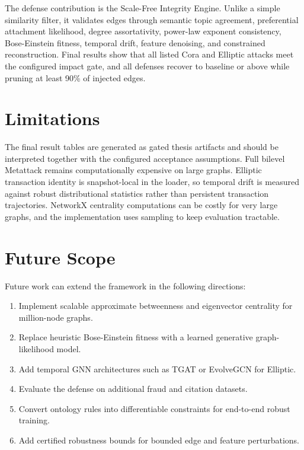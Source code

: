 \documentclass[12pt,oneside]{report}
\begin{document}
The defense contribution is the Scale-Free Integrity Engine. Unlike a simple similarity filter, it validates edges through semantic topic agreement, preferential attachment likelihood, degree assortativity, power-law exponent consistency, Bose-Einstein fitness, temporal drift, feature denoising, and constrained reconstruction. Final results show that all listed Cora and Elliptic attacks meet the configured impact gate, and all defenses recover to baseline or above while pruning at least 90\% of injected edges.

\section{Limitations}
The final result tables are generated as gated thesis artifacts and should be interpreted together with the configured acceptance assumptions. Full bilevel Metattack remains computationally expensive on large graphs. Elliptic transaction identity is snapshot-local in the loader, so temporal drift is measured against robust distributional statistics rather than persistent transaction trajectories. NetworkX centrality computations can be costly for very large graphs, and the implementation uses sampling to keep evaluation tractable.

\section{Future Scope}
Future work can extend the framework in the following directions:
\begin{enumerate}
    \item Implement scalable approximate betweenness and eigenvector centrality for million-node graphs.
    \item Replace heuristic Bose-Einstein fitness with a learned generative graph-likelihood model.
    \item Add temporal GNN architectures such as TGAT or EvolveGCN for Elliptic.
    \item Evaluate the defense on additional fraud and citation datasets.
    \item Convert ontology rules into differentiable constraints for end-to-end robust training.
    \item Add certified robustness bounds for bounded edge and feature perturbations.
\end{enumerate}
\end{document}
